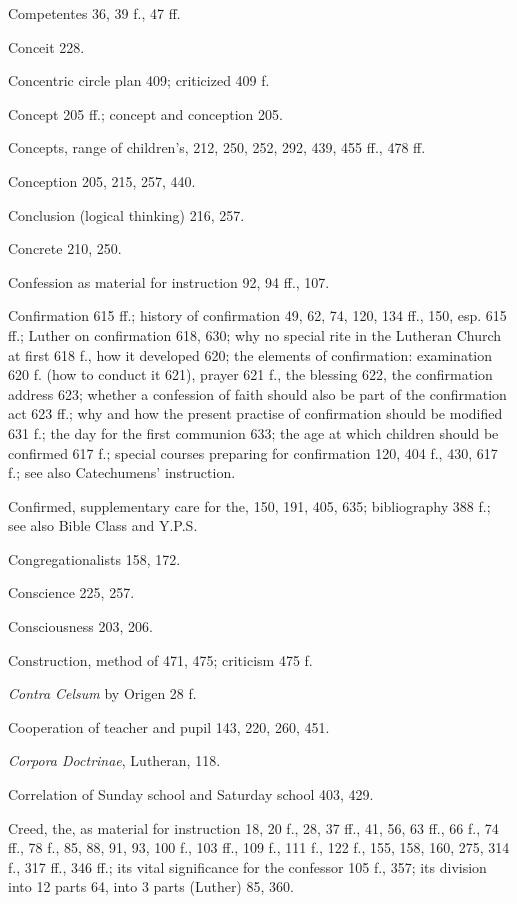 Competentes 36, 39 f., 47 ff.

Conceit 228.

Concentric circle plan 409; criticized 409 f.

Concept 205 ff.; concept and conception 205.

Concepts, range of children’s, 212, 250, 252, 292, 439, 455 ff., 478 ff.

Conception 205, 215, 257, 440.

Conclusion (logical thinking) 216, 257.

Concrete 210, 250.

Confession as material for instruction 92, 94 ff., 107.

Confirmation 615 ff.; history of confirmation 49, 62, 74, 120, 134 ff., 150, esp. 615 ff.; Luther on confirmation 618, 630; why no special rite in the Lutheran Church at first 618 f., how it developed 620; the elements of confirmation: examination 620 f. (how to conduct it 621), prayer 621 f., the blessing 622, the confirmation address 623; whether a confession of faith should also be part of the confirmation act 623 ff.; why and how the present practise of confirmation should be modified 631 f.; the day for the first communion 633; the age at which children should be confirmed 617 f.; special courses preparing for confirmation 120, 404 f., 430, 617 f.; see also Catechumens’ instruction.

Confirmed, supplementary care for the, 150, 191, 405, 635; bibliography 388 f.; see also Bible Class and Y.P.S.

Congregationalists 158, 172.

Conscience 225, 257.

Consciousness 203, 206.

Construction, method of 471, 475; criticism 475 f.

\emph{Contra Celsum} by Origen 28 f.

Cooperation of teacher and pupil 143, 220, 260, 451.

\emph{Corpora Doctrinae}, Lutheran, 118.

Correlation of Sunday school and Saturday school 403, 429.

Creed, the, as material for instruction 18, 20 f., 28, 37 ff., 41, 56, 63 ff., 66 f., 74 ff., 78 f., 85, 88, 91, 93, 100 f., 103 ff., 109 f., 111 f., 122 f., 155, 158, 160, 275, 314 f., 317 ff., 346 ff.; its vital significance for the confessor 105 f., 357; its division into 12 parts 64, into 3 parts (Luther) 85, 360.

